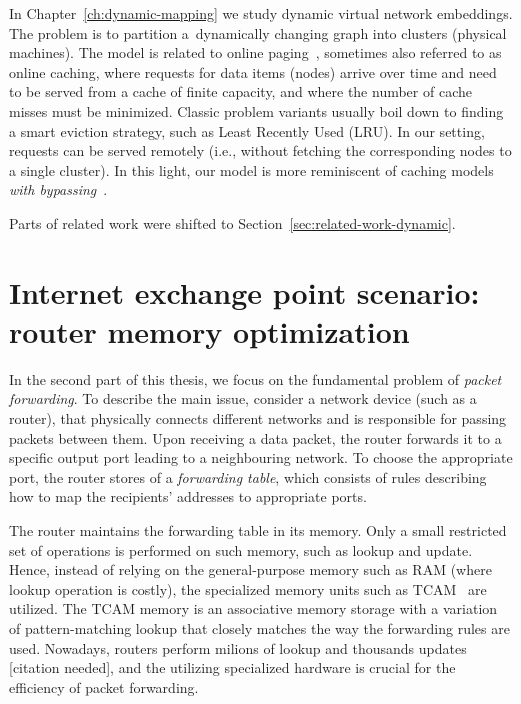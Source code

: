 In Chapter~\ref{ch:dynamic-mapping} we study dynamic virtual network embeddings.
The problem is to partition a~dynamically changing graph into clusters (physical machines).
The model is related to online
paging~\cite{SleTar85,FKLMSY91,McGSle91,AcChNo00}, sometimes also referred to
as online caching, where requests for data items (nodes) arrive over time and
need to be served from a cache of finite capacity, and where the number of
cache misses must be minimized. Classic problem variants usually boil down to
finding a smart eviction strategy, such as Least Recently Used (LRU). In our
setting, requests can be served remotely (i.e., without fetching the
corresponding nodes to a single cluster). In this light, our model is more
reminiscent of caching models \emph{with
bypassing}~\cite{EpImLN11,EpImLN15,Irani02}.




Parts of related work were shifted to Section~\ref{sec:related-work-dynamic}.



\section{Internet exchange point scenario: router memory optimization}
\label{sec:intro-packet-forwarding}

In the second part of this thesis, we focus on the fundamental problem of \emph{packet forwarding}.
To describe the main issue, consider a network device (such as a router), that physically connects different networks and is responsible for passing packets between them.
Upon receiving a data packet, the router forwards it to a specific output port leading to a neighbouring network.
To choose the appropriate port, the router stores of a \emph{forwarding table}, which consists of rules describing how to map the recipients' addresses to appropriate ports.

The router maintains the forwarding table in its memory.
Only a small restricted set of operations is performed on such memory, such as lookup and update.
Hence, instead of relying on the general-purpose memory such as RAM (where lookup operation is costly), the specialized memory units such as TCAM~\cite{tcam-memory} are utilized.
The TCAM memory is an associative memory storage with a variation of pattern-matching lookup that closely matches the way the forwarding rules are used.
Nowadays, routers perform milions of lookup and thousands updates [citation needed], and the utilizing specialized hardware is crucial for the efficiency of packet forwarding.

